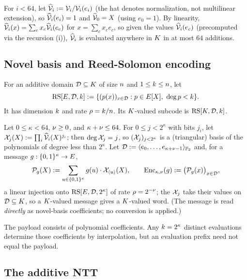 For $i<64$, let $\widehat{\mathcal{V}}_{i} := \mathcal{V}_i / \mathcal{V}_i(e_i)$ (the hat denotes normalization, not multilinear extension), so $\widehat{\mathcal{V}}_{i}(e_i) = 1$ and $\widehat{\mathcal{V}}_{0} = X$ (using $e_0 = 1$). By linearity, $\widehat{\mathcal{V}}_{i}(x) = \sum_c x_c \widehat{\mathcal{V}}_{i}(e_c)$ for $x = \sum_c x_c e_c$, so given the values $\widehat{\mathcal{V}}_{i}(e_c)$ (precomputed via the recursion (i)), $\widehat{\mathcal{V}}_{i}$ is evaluated anywhere in $K$ in at most $64$ additions.

\subsection{Novel basis and Reed-Solomon encoding}\label{sec:ntt-encoding}

\begin{definition}\label{def:rs-code}
For an additive domain $\mathcal{D}\subseteq K$ of size $n$ and $1\le k\le n$, let
\[
  \mathrm{RS}[E,\mathcal{D},k]
  :=\{(p(x))_{x\in\mathcal{D}}:p\in E[X],\ \deg p<k\}.
\]
It has dimension $k$ and rate $\rho=k/n$. Its $K$-valued subcode is $\mathrm{RS}[K,\mathcal{D},k]$.
\end{definition}

\begin{definition}\label{def:enc}
Let $0\le\kappa<64$, $\nu\ge0$, and $\kappa+\nu\le64$. For $0 \le j < 2^{\kappa}$ with bits $j_i$, let $\mathcal{X}_j(X) := \prod_i \widehat{\mathcal{V}}_{i}(X)^{j_i}$; then $\deg \mathcal{X}_j = j$, so $(\mathcal{X}_j)_{j < 2^\kappa}$ is a (triangular) basis of the polynomials of degree less than $2^{\kappa}$. Let $\mathcal{D} := \langle e_0, \dots, e_{\kappa+\nu-1} \rangle_{\mathbb{F}_2}$ and, for a message $g : \{0,1\}^{\kappa} \to E$,
\[
\mathcal{P}_g(X) := \sum_{u \in \{0,1\}^{\kappa}} g(u) \cdot \mathcal{X}_{\langle u \rangle}(X), \qquad \mathrm{Enc}_{\kappa,\nu}(g) := \bigl(\mathcal{P}_g(x)\bigr)_{x \in \mathcal{D}},
\]
a linear injection onto $\mathrm{RS}[E, \mathcal{D}, 2^{\kappa}]$ of rate $\rho = 2^{-\nu}$; the $\mathcal{X}_j$ take their values on $\mathcal{D} \subseteq K$, so a $K$-valued message gives a $K$-valued word. (The message is read \emph{directly} as novel-basis coefficients; no conversion is applied.)
\end{definition}

The payload consists of polynomial coefficients. Any $k=2^\kappa$ distinct evaluations determine those coefficients by interpolation, but an evaluation prefix need not equal the payload.

\subsection{The additive NTT}\label{sec:ntt}

